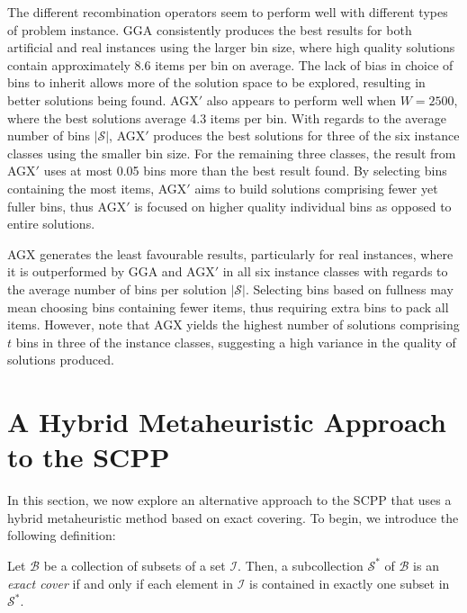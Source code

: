 \documentclass[authoryear]{elsarticle}
\begin{document}
The different recombination operators seem to perform well with different types of problem instance. GGA consistently produces the best results for both artificial and real instances using the larger bin size, where high quality solutions contain approximately 8.6 items per bin on average. The lack of bias in choice of bins to inherit allows more of the solution space to be explored, resulting in better solutions being found. AGX$'$ also appears to perform well when $W=2500$, where the best solutions average 4.3 items per bin. With regards to the average number of bins $|\mathcal{S}|$, AGX$'$ produces the best solutions for three of the six instance classes using the smaller bin size. For the remaining three classes, the result from AGX$'$ uses at most 0.05 bins more than the best result found. By selecting bins containing the most items, AGX$'$ aims to build solutions comprising fewer yet fuller bins, thus AGX$'$ is focused on higher quality individual bins as opposed to entire solutions.


AGX generates the least favourable results, particularly for real instances, where it is outperformed by GGA and AGX$'$ in all six instance classes with regards to the average number of bins per solution $|\mathcal{S}|$. Selecting bins based on fullness may mean choosing bins containing fewer items, thus requiring extra bins to pack all items. However, note that AGX yields the highest number of solutions comprising $t$ bins in three of the instance classes, suggesting a high variance in the quality of solutions produced.

\section{A Hybrid Metaheuristic Approach to the SCPP}
\label{sec:cmsa}
\noindent In this section, we now explore an alternative approach to the SCPP that uses a hybrid metaheuristic method based on exact covering. To begin, we introduce the following definition:

\begin{definition}
	\label{defn:exactcover}
	Let $\mathcal{B}$ be a collection of subsets of a set $\mathcal{I}$. Then, a subcollection $\mathcal{S}^*$ of $\mathcal{B}$ is an \emph{exact cover} if and only if each element in $\mathcal{I}$ is contained in exactly one subset in $\mathcal{S}^*$.
\end{definition}	
\end{document}
